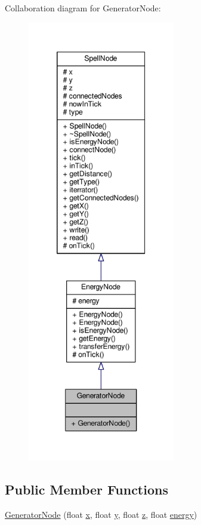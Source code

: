 Collaboration diagram for Generator\-Node\-:
\nopagebreak
\begin{figure}[H]
\begin{center}
\leavevmode
\includegraphics[height=550pt]{class_generator_node__coll__graph}
\end{center}
\end{figure}
\subsection*{Public Member Functions}
\begin{DoxyCompactItemize}
\item 
\hyperlink{class_generator_node_a818fc87988252b472a233b91d4fa38cd}{Generator\-Node} (float \hyperlink{class_spell_node_a916f2a709a674dd2a61530b6acc339cc}{x}, float \hyperlink{class_spell_node_a754d80fd0fd82dbc12443b5f277b9fb4}{y}, float \hyperlink{class_spell_node_aff090331ff1bd816a22e974a50c1a180}{z}, float \hyperlink{class_energy_node_ac2cd46828178316e24f339489f553852}{energy})
\end{DoxyCompactItemize}
